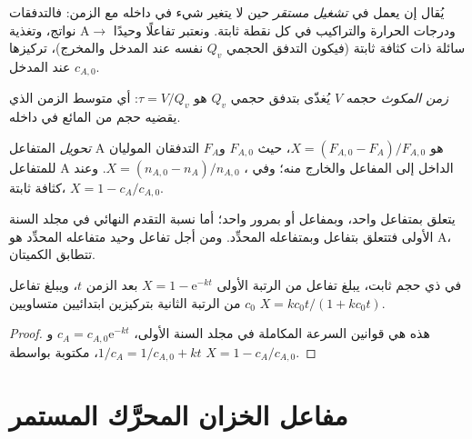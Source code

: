 يُقال إن  يعمل في \emph{تشغيل مستقر} حين لا يتغير شيء في
داخله مع الزمن: فالتدفقات ودرجات الحرارة والتراكيب في كل نقطة
ثابتة. ونعتبر تفاعلًا وحيدًا
$\mathrm A \to$ نواتج، وتغذية سائلة ذات كثافة ثابتة (فيكون
التدفق الحجمي $Q_v$ نفسه عند المدخل والمخرج)، تركيزها
$c_{A,0}$ عند المدخل.

\begin{definition}\label{def:b2:continuous-reactors:residence-time}
\emph{زمن المكوث}  حجمه
$V$ يُغذّى بتدفق حجمي $Q_v$ هو $\tau = V/Q_v$: أي متوسط
الزمن الذي يقضيه حجم من المائع في داخله.
\end{definition}

\begin{definition}[التحويل]\label{def:b2:continuous-reactors:conversion}
\emph{تحويل} المتفاعل A هو $X = (F_{A,0} -
F_A)/F_{A,0}$، حيث $F_{A,0}$ و$F_A$ التدفقان الموليان للمتفاعل A
الداخل إلى المفاعل والخارج منه؛ وفي ، $X = (n_{A,0} -
n_A)/n_{A,0}$. وعند كثافة ثابتة، $X = 1 - c_A/c_{A,0}$.
\end{definition}

يتعلق  بمتفاعل واحد، وبمفاعل أو بمرور واحد؛ أما نسبة التقدم
النهائي في مجلد السنة الأولى فتتعلق بتفاعل وبمتفاعله
المحدِّد. ومن أجل تفاعل وحيد متفاعله المحدِّد هو A، تتطابق
الكميتان.

\begin{proposition}\label{prop:b2:continuous-reactors:batch}
في  ذي حجم ثابت، يبلغ تفاعل من الرتبة الأولى
 $X = 1 - \mathrm e^{-kt}$ بعد الزمن $t$، ويبلغ تفاعل من الرتبة
الثانية بتركيزين ابتدائيين متساويين $c_0$  $X =
kc_0t/(1 + kc_0t)$.
\end{proposition}

\begin{proof}
هذه هي قوانين السرعة المكاملة في مجلد السنة الأولى، $c_A = c_{A,0}
\mathrm e^{-kt}$ و$1/c_A = 1/c_{A,0} + kt$، مكتوبة بواسطة $X = 1 -
c_A/c_{A,0}$.
\end{proof}

\section{مفاعل الخزان المحرَّك المستمر}

